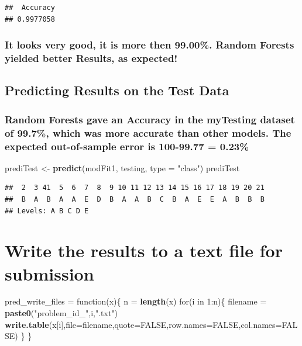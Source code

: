 \documentclass[]{article}
\newenvironment{Shaded}{\begin{snugshade}}{\end{snugshade}}
\newcommand{\KeywordTok}[1]{\textcolor[rgb]{0.13,0.29,0.53}{\textbf{{#1}}}}
\newcommand{\DataTypeTok}[1]{\textcolor[rgb]{0.13,0.29,0.53}{{#1}}}
\newcommand{\DecValTok}[1]{\textcolor[rgb]{0.00,0.00,0.81}{{#1}}}
\newcommand{\StringTok}[1]{\textcolor[rgb]{0.31,0.60,0.02}{{#1}}}
\newcommand{\OtherTok}[1]{\textcolor[rgb]{0.56,0.35,0.01}{{#1}}}
\newcommand{\NormalTok}[1]{{#1}}
\begin{document}
\begin{verbatim}
##  Accuracy 
## 0.9977058
\end{verbatim}

\subsubsection{It looks very good, it is more then 99.00\%. Random
Forests yielded better Results, as
expected!}\label{it-looks-very-good-it-is-more-then-99.00.-random-forests-yielded-better-results-as-expected}

\subsection{Predicting Results on the Test
Data}\label{predicting-results-on-the-test-data}

\subsubsection{Random Forests gave an Accuracy in the myTesting dataset
of 99.7\%, which was more accurate than other models. The expected
out-of-sample error is 100-99.77 =
0.23\%}\label{random-forests-gave-an-accuracy-in-the-mytesting-dataset-of-99.7-which-was-more-accurate-than-other-models.-the-expected-out-of-sample-error-is-100-99.77-0.23}

\begin{Shaded}
\begin{Highlighting}[]
\NormalTok{prediTest <-}\StringTok{ }\KeywordTok{predict}\NormalTok{(modFit1, testing, }\DataTypeTok{type =} \StringTok{"class"}\NormalTok{)}
\NormalTok{prediTest}
\end{Highlighting}
\end{Shaded}

\begin{verbatim}
##  2  3 41  5  6  7  8  9 10 11 12 13 14 15 16 17 18 19 20 21 
##  B  A  B  A  A  E  D  B  A  A  B  C  B  A  E  E  A  B  B  B 
## Levels: A B C D E
\end{verbatim}

\section{Write the results to a text file for
submission}\label{write-the-results-to-a-text-file-for-submission}

\begin{Shaded}
\begin{Highlighting}[]
\NormalTok{pred_write_files =}\StringTok{ }\NormalTok{function(x)\{}
    \NormalTok{n =}\StringTok{ }\KeywordTok{length}\NormalTok{(x)}
    \NormalTok{for(i in }\DecValTok{1}\NormalTok{:n)\{}
        \NormalTok{filename =}\StringTok{ }\KeywordTok{paste0}\NormalTok{(}\StringTok{"problem_id_"}\NormalTok{,i,}\StringTok{".txt"}\NormalTok{)}
        \KeywordTok{write.table}\NormalTok{(x[i],}\DataTypeTok{file=}\NormalTok{filename,}\DataTypeTok{quote=}\OtherTok{FALSE}\NormalTok{,}\DataTypeTok{row.names=}\OtherTok{FALSE}\NormalTok{,}\DataTypeTok{col.names=}\OtherTok{FALSE}\NormalTok{)}
    \NormalTok{\}}
\NormalTok{\}}
\end{Highlighting}
\end{Shaded}
\end{document}
